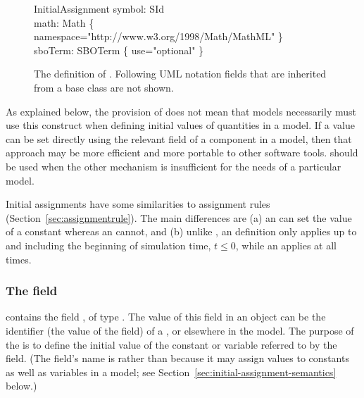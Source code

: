 \begin{figure}[htb]
  \centering
  \small
    \begin{classbox}{InitialAssignment}
      symbol: SId                                                     \\
      math: Math \{ namespace="http://www.w3.org/1998/Math/MathML" \} \\
      sboTerm: SBOTerm \{ use="optional" \}                           \\
    \end{classbox}
  \caption{The definition of \InitialAssignment.
    Following UML notation fields
    that are inherited from a base class are not shown.}
  \label{fig:initialAssignment}
\end{figure}

As explained below, the provision of \InitialAssignment does not
mean that models necessarily must use this construct when defining
initial values of quantities in a model.  If a value can be set
directly using the relevant field of a component in a model, then
that approach may be more efficient and more portable to other
software tools.  \InitialAssignment should be used when the other
mechanism is insufficient for the needs of a particular model.

Initial assignments have some similarities to assignment rules
(Section~\ref{sec:assignmentrule}).  The main differences are (a)
an \InitialAssignment can set the value of a constant whereas an
\AssignmentRule cannot, and (b) unlike \AssignmentRule, an
\InitialAssignment definition only applies up to and including the
beginning of simulation time, \ie $t \leq 0$, while an
\AssignmentRule applies at all times.


\subsubsection{The  field}

\InitialAssignment contains the field , of type
.  The value of this field in an \InitialAssignment
object can be the identifier (\ie the value of the 
field) of a \Compartment, \Species or \Parameter elsewhere in the
model.  The purpose of the \InitialAssignment is to define the
initial value of the constant or variable referred to by the
 field.  (The field's name is  rather
than  because it may assign values to constants as
well as variables in a model; see
Section~\ref{sec:initial-assignment-semantics} below.)

